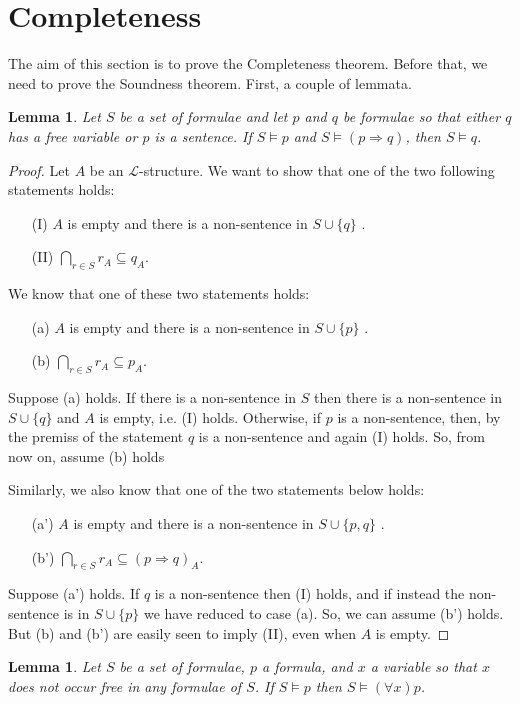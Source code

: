 \documentclass{report}
\theoremstyle{definition}
\theoremstyle{plain}
\newtheorem{lem}[thm]{Lemma}
\theoremstyle{definition}
\begin{document}
	\section{Completeness}
	The aim of this section is to prove the Completeness theorem. Before that, we need to prove the Soundness theorem. First, a couple of lemmata.
	\begin{lem}\label{lem:sem_mp}
		Let $S$ be a set of formulae and let $p$ and $q$ be formulae so that either $q$ has a free variable or $p$ is a sentence. If $S\models p$ and $S\models (p\Rightarrow q)$, then $S\models q$.
	\end{lem}
	\begin{proof}
		Let $A$ be an $\mathcal{L}$-structure. We want to show that one of the two following statements holds:
		\begin{enumerate}
			\item[(I)] $A$ is empty and there is a non-sentence in $S\cup \{q\}$ .
			\item[(II)] $\bigcap_{r\in S} r_A \subseteq q_A$.
		\end{enumerate}
		We know that one of these two statements holds:
		\begin{enumerate}
			\item[(a)] $A$ is empty and there is a non-sentence in $S\cup \{p\}$ .
			\item[(b)] $\bigcap_{r\in S} r_A \subseteq p_A$.
		\end{enumerate}
		Suppose (a) holds. If there is a non-sentence in $S$ then there is a non-sentence in $S\cup \{q\}$ and $A$ is empty, i.e. (I) holds. Otherwise, if $p$ is a non-sentence, then, by the premiss of the statement $q$ is a non-sentence and again (I) holds. So, from now on, assume (b) holds	
		
		Similarly, we also know that one of the two statements below holds:
		\begin{enumerate}
			\item[(a')] $A$ is empty and there is a non-sentence in $S\cup \{p,q\}$ .
			\item[(b')] $\bigcap_{r\in S} r_A \subseteq (p\Rightarrow q)_A$.
		\end{enumerate}
		Suppose (a') holds. If $q$ is a non-sentence then (I) holds, and if instead the non-sentence is in $S\cup \{p\}$ we have reduced to case (a). So, we can assume (b') holds. But (b) and (b') are easily seen to imply (II), even when $A$ is empty.	
	\end{proof}
	\begin{lem}\label{lem:sem_gen}
		Let $S$ be a set of formulae, $p$ a formula, and $x$ a variable so that $x$ does not occur free in any formulae of $S$. If $S\models p$ then $S\models (\forall x)p$.
	\end{lem}
\end{document}
